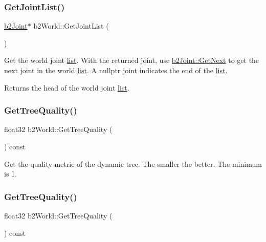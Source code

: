 \subsubsection{\texorpdfstring{Get\+Joint\+List()}{GetJointList()}\hspace{0.1cm}{\footnotesize\ttfamily [2/2]}}
{\footnotesize\ttfamily \hyperlink{classb2Joint}{b2\+Joint}$\ast$ b2\+World\+::\+Get\+Joint\+List (\begin{DoxyParamCaption}{ }\end{DoxyParamCaption})}

Get the world joint \hyperlink{protocollist-p}{list}. With the returned joint, use \hyperlink{classb2Joint_a1a0e2137b631010750c728cb4e276e5d}{b2\+Joint\+::\+Get\+Next} to get the next joint in the world \hyperlink{protocollist-p}{list}. A nullptr joint indicates the end of the \hyperlink{protocollist-p}{list}. \begin{DoxyReturn}{Returns}
the head of the world joint \hyperlink{protocollist-p}{list}. 
\end{DoxyReturn}
\mbox{\label{classb2World_a562935b3b8161dd18a467e02f479e88a}} 
\subsubsection{\texorpdfstring{Get\+Tree\+Quality()}{GetTreeQuality()}\hspace{0.1cm}{\footnotesize\ttfamily [1/2]}}
{\footnotesize\ttfamily float32 b2\+World\+::\+Get\+Tree\+Quality (\begin{DoxyParamCaption}{ }\end{DoxyParamCaption}) const}

Get the quality metric of the dynamic tree. The smaller the better. The minimum is 1. \mbox{\label{classb2World_a562935b3b8161dd18a467e02f479e88a}} 
\subsubsection{\texorpdfstring{Get\+Tree\+Quality()}{GetTreeQuality()}\hspace{0.1cm}{\footnotesize\ttfamily [2/2]}}
{\footnotesize\ttfamily float32 b2\+World\+::\+Get\+Tree\+Quality (\begin{DoxyParamCaption}{ }\end{DoxyParamCaption}) const}

